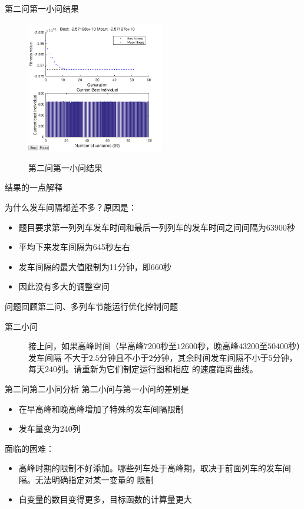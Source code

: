 \documentclass{beamer}
\begin{document}
\begin{frame}{第二问第一小问结果}
\begin{figure}
  \centering
  \includegraphics[width=6cm]{fig/fig13/fig13.pdf}\\
  \caption{第二问第一小问结果}
\end{figure}

\end{frame}

\begin{frame}{结果的一点解释}

为什么发车间隔都差不多？原因是：
\begin{itemize}
    \item 题目要求第一列列车发车时间和最后一列列车的发车时间之间间隔为63900秒
    \item 平均下来发车间隔为645秒左右
    \item 发车间隔的最大值限制为11分钟，即660秒
    \item 因此没有多大的调整空间
\end{itemize}

\end{frame}

\begin{frame}{问题回顾}{第二问、多列车节能运行优化控制问题}
\begin{description}
  \item[第二小问] 接上问，如果高峰时间（早高峰$7200$秒至$12600$秒，晚高峰$43200$至$50400$秒）发车间隔
  不大于$2.5$分钟且不小于$2$分钟，其余时间发车间隔不小于$5$分钟，每天$240$列。请重新为它们制定运行图和相应
  的速度距离曲线。
\end{description}
\end{frame}

\begin{frame}{第二问第二小问分析}
第二小问与第一小问的差别是
\begin{itemize}
    \item 在早高峰和晚高峰增加了特殊的发车间隔限制
    \item 发车量变为240列
\end{itemize}
面临的困难：
\begin{itemize}
    \item 高峰时期的限制不好添加。哪些列车处于高峰期，取决于前面列车的发车间隔。无法明确指定对某一变量的
    限制
    \item 自变量的数目变得更多，目标函数的计算量更大
\end{itemize}
\end{frame}
\end{document}

